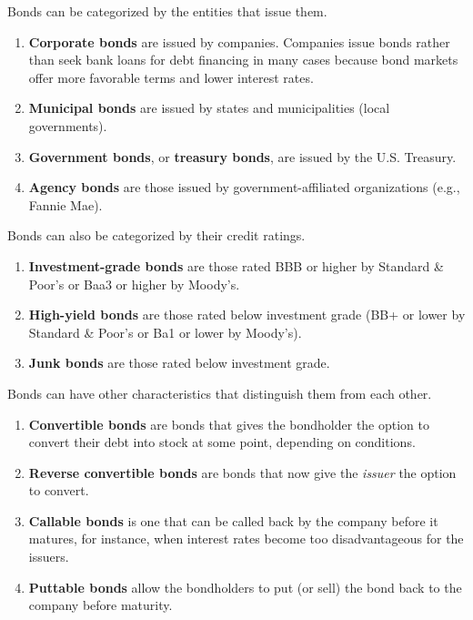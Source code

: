 \documentclass{article}
\begin{document}
    \begin{definition}
      Bonds can be categorized by the entities that issue them.
      \begin{enumerate}
        \item \textbf{Corporate bonds} are issued by companies. Companies issue bonds rather than seek bank loans for debt financing in many cases because bond markets offer more favorable terms and lower interest rates.
        \item \textbf{Municipal bonds} are issued by states and municipalities (local governments).
        \item \textbf{Government bonds}, or \textbf{treasury bonds}, are issued by the U.S. Treasury.
        \item \textbf{Agency bonds} are those issued by government-affiliated organizations (e.g., Fannie Mae).
      \end{enumerate}
    \end{definition}

    \begin{definition}
      Bonds can also be categorized by their credit ratings. 
      \begin{enumerate}
        \item \textbf{Investment-grade bonds} are those rated BBB or higher by Standard \& Poor's or Baa3 or higher by Moody's. 
        \item \textbf{High-yield bonds} are those rated below investment grade (BB+ or lower by Standard \& Poor's or Ba1 or lower by Moody's). 
        \item \textbf{Junk bonds} are those rated below investment grade. 
      \end{enumerate}
    \end{definition}

    \begin{definition}
      Bonds can have other characteristics that distinguish them from each other. 
      \begin{enumerate}
        \item \textbf{Convertible bonds} are bonds that gives the bondholder the option to convert their debt into stock at some point, depending on conditions.
        \item \textbf{Reverse convertible bonds} are bonds that now give the \textit{issuer} the option to convert.
        \item \textbf{Callable bonds} is one that can be called back by the company before it matures, for instance, when interest rates become too disadvantageous for the issuers.
        \item \textbf{Puttable bonds} allow the bondholders to put (or sell) the bond back to the company before maturity.
      \end{enumerate}
    \end{definition}
\end{document}
